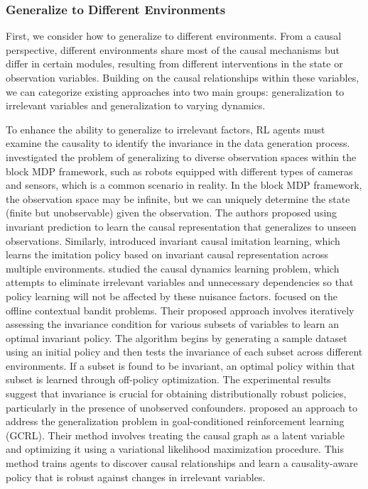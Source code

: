 \documentclass[10pt]{article} %
\theoremstyle{definition}
\begin{document}
\subsubsection{Generalize to Different Environments}

First, we consider how to generalize to different environments. From a causal perspective, different environments share most of the causal mechanisms but differ in certain modules, resulting from different interventions in the state or observation variables. Building on the causal relationships within these variables, we can categorize existing approaches into two main groups: generalization to irrelevant variables and generalization to varying dynamics.

To enhance the ability to generalize to irrelevant factors, RL agents must examine the causality to identify the invariance in the data generation process. 
\citet{zhangInvariantCausalPrediction2020a} investigated the problem of generalizing to diverse observation spaces within the block MDP framework, such as robots equipped with different types of cameras and sensors, which is a common scenario in reality.  In the block MDP framework, the observation space may be infinite, but we can uniquely determine the state (finite but unobservable) given the observation. The authors proposed using invariant prediction to learn the causal representation that generalizes to unseen observations. 
Similarly, \citet{bicaInvariantCausalImitation2021a} introduced invariant causal imitation learning, which learns the imitation policy based on invariant causal representation across multiple environments. 
\citet{wangCausalDynamicsLearning2022a} studied the causal dynamics learning problem, which attempts to eliminate irrelevant variables and unnecessary dependencies so that policy learning will not be affected by these nuisance factors. 
\citet{saengkyongamInvariantPolicyLearning2022} focused on the offline contextual bandit problems. Their proposed approach involves iteratively assessing the invariance condition for various subsets of variables to learn an optimal invariant policy. The algorithm begins by generating a sample dataset using an initial policy and then tests the invariance of each subset across different environments. If a subset is found to be invariant, an optimal policy within that subset is learned through off-policy optimization. The experimental results suggest that invariance is crucial for obtaining distributionally robust policies, particularly in the presence of unobserved confounders.
\citet{dingGeneralizingGoalConditionedReinforcement2022a} proposed an approach to address the generalization problem in goal-conditioned reinforcement learning (GCRL). Their method involves treating the causal graph as a latent variable and optimizing it using a variational likelihood maximization procedure. This method trains agents to discover causal relationships and learn a causality-aware policy that is robust against changes in irrelevant variables. 
\end{document}
